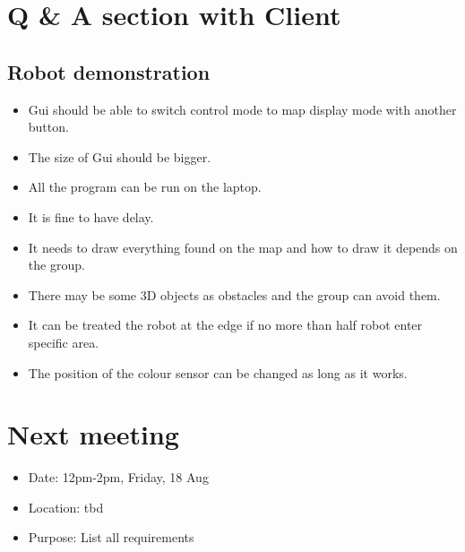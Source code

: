 \documentclass[11pt, a4paper]{article}
\begin{document}
\section{Q \& A section with Client}

\subsection{Robot demonstration}
\begin{itemize}
\item Gui should be able to switch control mode to map display mode with another button.
\item The size of Gui should be bigger.
\item All the program can be run on the laptop.
\item It is fine to have delay.
\item It needs to draw everything found on the map and how to draw it depends on the group.
\item There may be some 3D objects as obstacles and the group can avoid them.
\item It can be treated the robot at the edge if no more than half robot enter specific area.
\item The position of the colour sensor can be changed as long as it works.
\end{itemize}





\section{Next meeting}
\begin{itemize}
\item Date: 12pm-2pm, Friday, 18 Aug
\item Location: tbd
\item Purpose: List all requirements
\end{itemize}

\vspace*{10pt}
\end{document}
